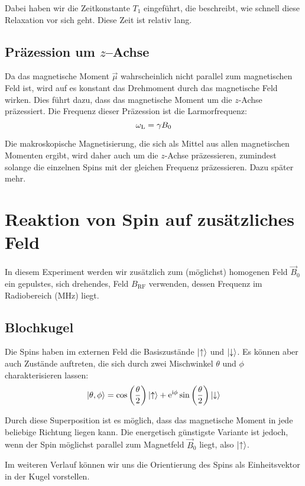 Dabei haben wir die Zeitkonstante $T_1$ eingeführt, die beschreibt, wie schnell
diese Relaxation vor sich geht. Diese Zeit ist relativ lang.

\subsection{Präzession um $z$–Achse}
\label{subsec:Präzession}

Da das magnetische Moment $\vec\mu$ wahrscheinlich nicht parallel zum
magnetischen Feld ist, wird auf es konstant das Drehmoment durch das
magnetische Feld wirken. Dies führt dazu, dass das magnetische Moment um die
$z$-Achse präzessiert. Die Frequenz dieser Präzession ist die Larmorfrequenz:
\[
    \omega_\text L = \gamma B_0
\]

Die makroskopische Magnetisierung, die sich als Mittel aus allen magnetischen
Momenten ergibt, wird daher auch um die $z$-Achse präzessieren, zumindest
solange die einzelnen Spins mit der gleichen Frequenz präzessieren. Dazu später
mehr.

\section{Reaktion von Spin auf zusätzliches Feld}

In diesem Experiment werden wir zusätzlich zum (möglichst) homogenen Feld $\vec
B_0$ ein gepulstes, sich drehendes, Feld $B_\text{RF}$ verwenden, dessen
Frequenz im Radiobereich (\si{\mega\hertz}) liegt.

\subsection{Blochkugel}

Die Spins haben im externen Feld die Basiszustände $\ket\uparrow$ und
$\ket\downarrow$. Es können aber auch Zustände auftreten, die sich durch zwei
Mischwinkel $\theta$ und $\phi$ charakterisieren lassen:
\parencite{wikipedia/bloch_kugel}
\[
    \ket{\theta, \phi}
    = \cos\del{\frac\theta2} \ket\uparrow
    + \eup^{\iup \phi} \sin\del{\frac\theta2} \ket\downarrow
\]

Durch diese Superposition ist es möglich, dass das magnetische Moment in jede
beliebige Richtung liegen kann. Die energetisch günstigste Variante ist jedoch,
wenn der Spin möglichst parallel zum Magnetfeld $\vec B_0$ liegt, also
$\ket\uparrow$.

Im weiteren Verlauf können wir uns die Orientierung des Spins als
Einheitsvektor in der Kugel vorstellen.

